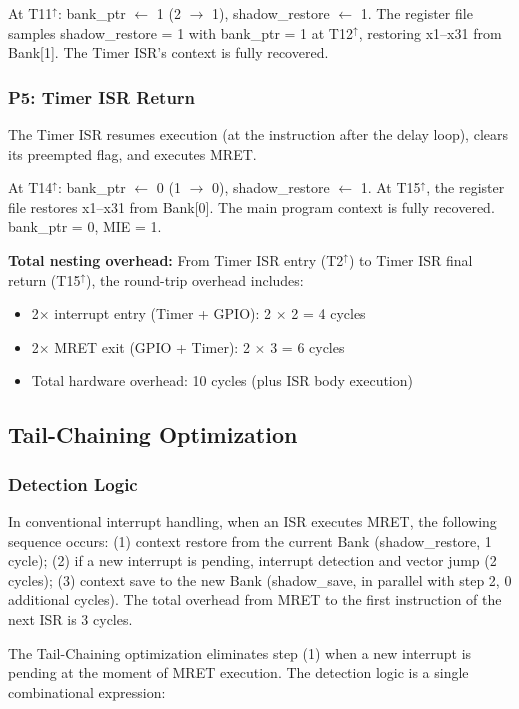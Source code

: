 \documentclass[letterpaper,journal]{IEEEtran}
\begin{document}
At T11$^\uparrow$: bank\_ptr $\leftarrow$ 1 (2 $\rightarrow$ 1), shadow\_restore $\leftarrow$ 1. The register file samples shadow\_restore = 1 with bank\_ptr = 1 at T12$^\uparrow$, restoring x1--x31 from Bank[1]. The Timer ISR's context is fully recovered.

\subsubsection{P5: Timer ISR Return}

The Timer ISR resumes execution (at the instruction after the delay loop), clears its preempted flag, and executes MRET.

At T14$^\uparrow$: bank\_ptr $\leftarrow$ 0 (1 $\rightarrow$ 0), shadow\_restore $\leftarrow$ 1. At T15$^\uparrow$, the register file restores x1--x31 from Bank[0]. The main program context is fully recovered. bank\_ptr = 0, MIE = 1.

\textbf{Total nesting overhead:} From Timer ISR entry (T2$^\uparrow$) to Timer ISR final return (T15$^\uparrow$), the round-trip overhead includes:
\begin{itemize}
\item 2$\times$ interrupt entry (Timer + GPIO): 2 $\times$ 2 = 4 cycles
\item 2$\times$ MRET exit (GPIO + Timer): 2 $\times$ 3 = 6 cycles
\item Total hardware overhead: 10 cycles (plus ISR body execution)
\end{itemize}

\subsection{Tail-Chaining Optimization}

\subsubsection{Detection Logic}

In conventional interrupt handling, when an ISR executes MRET, the following sequence occurs: (1) context restore from the current Bank (shadow\_restore, 1 cycle); (2) if a new interrupt is pending, interrupt detection and vector jump (2 cycles); (3) context save to the new Bank (shadow\_save, in parallel with step 2, 0 additional cycles). The total overhead from MRET to the first instruction of the next ISR is 3 cycles.

The Tail-Chaining optimization eliminates step (1) when a new interrupt is pending at the moment of MRET execution.
The detection logic is a single combinational expression:
\end{document}
